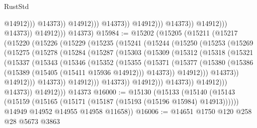 \begin{lexlean}{RustStd}
\begin{coremodule}
                                                    @14912)))
                                              @14373))
                                          @14912)))
                                    @14373))
                                @14912)))
                          @14373))
                      @14912)))
                @14373))
            @14912)))
      @14373)
@15984 := @15202
    (@15205
      (@15211
        (@15217
          (@15220
            (@15226
              (@15229
                (@15235
                  (@15241
                    (@15244
                      (@15250
                        (@15253
                          (@15269
                            (@15275
                              (@15278
                                (@15284
                                  (@15287
                                    (@15303
                                      (@15309
                                        (@15312
                                          (@15318
                                            (@15321
                                              (@15337
                                                (@15343
                                                  (@15346
                                                    (@15352
                                                      (@15355
                                                        (@15371
                                                          (@15377
                                                            (@15380
                                                              (@15386
                                                                (@15389
                                                                  (@15405 (@15411 @15936 @14912)))
                                                                @14373))
                                                            @14912)))
                                                      @14373))
                                                  @14912)))
                                            @14373))
                                        @14912)))
                                  @14373))
                              @14912)))
                        @14373))
                    @14912)))
              @14373))
          @14912)))
    @14373
@16000 := @15130
    (@15133
      (@15140
        (@15143 (@15159 (@15165 (@15171 (@15187 (@15193 (@15196 @15984) @14913))))))
        @14949
        @14952
        @14955
        @14958
        @11658))
@16006 := @14651 @1750 @120 @258 @28 @5673 @3863

\end{coremodule}
\end{lexlean}
